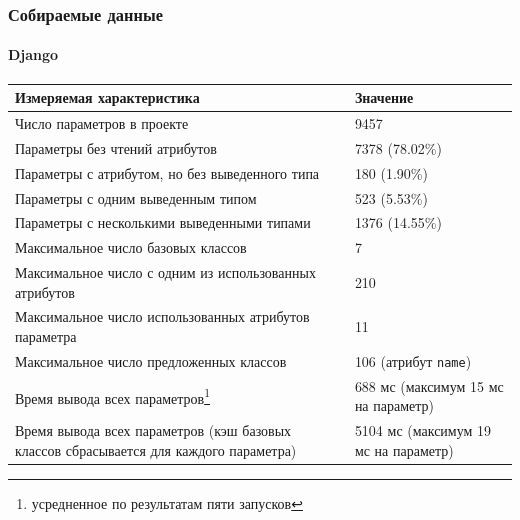 \documentclass[handout]{beamer}
\begin{document}
\begin{frame}
  \frametitle{Собираемые данные}
  \framesubtitle{Django}

  \begin{table}[H]
    \scriptsize

    \begin{tabularx}{\textwidth}{ |X|X| }
      \hline

      \bfseries Измеряемая характеристика & \bfseries Значение

      \\ \hline

      Число параметров в проекте & 9457 
      \\ \hline
      Параметры без чтений атрибутов & 7378 (78.02\%) 
      \\ \hline
      Параметры с атрибутом, но без выведенного типа & 180 (1.90\%) 
      \\ \hline
      Параметры с одним выведенным типом & 523 (5.53\%) 
      \\ \hline
      Параметры с несколькими выведенными типами & 1376 (14.55\%) 
      \\ \hline

      Максимальное число базовых классов & 7 
      \\ \hline
      Максимальное число с одним из использованных атрибутов & 210 
      \\ \hline
      Максимальное число использованных атрибутов параметра & 11 
      \\ \hline
      Максимальное число предложенных классов & 106 (атрибут \texttt{name}) 
      \\ \hline

      Время вывода всех параметров\footnote{усредненное по результатам пяти запусков} & 688 мс (максимум 15 мс на параметр)
      \\ \hline

      Время вывода всех параметров (кэш базовых классов сбрасывается
      для каждого параметра) & 5104 мс (максимум 19 мс на параметр)
      \\ \hline

    \end{tabularx}
  \end{table}
\end{frame}
\end{document}
